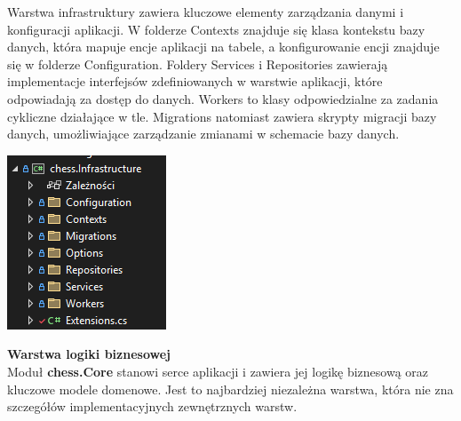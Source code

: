 \documentclass[12pt,a4paper]{article}
\begin{document}
\vspace{0.5cm}
\begin{minipage}[t]{0.45\textwidth}
    \vspace{0pt}
    \raggedright
    Warstwa infrastruktury zawiera kluczowe elementy zarządzania danymi i konfiguracji aplikacji. W folderze Contexts znajduje się klasa kontekstu bazy danych, która mapuje encje aplikacji na tabele, a konfigurowanie encji znajduje się w folderze Configuration. Foldery Services i Repositories zawierają implementacje interfejsów zdefiniowanych w warstwie aplikacji, które odpowiadają za dostęp do danych. Workers to klasy odpowiedzialne za zadania cykliczne działające w tle. Migrations natomiast zawiera skrypty migracji bazy danych, umożliwiające zarządzanie zmianami w schemacie bazy danych.
\end{minipage}
\hfill
\begin{minipage}[t]{0.45\textwidth}
    \vspace{0pt}
    \centering
    \includegraphics[width=\linewidth]{images/struktura_back_infrastructure.png} 
\end{minipage}
\vspace{0.5cm}

\noindent \textbf{Warstwa logiki biznesowej}\\
Moduł \textbf{chess.Core} stanowi serce aplikacji i zawiera jej logikę biznesową oraz kluczowe modele domenowe. Jest to najbardziej niezależna warstwa, która nie zna szczegółów implementacyjnych zewnętrznych warstw.
\end{document}
